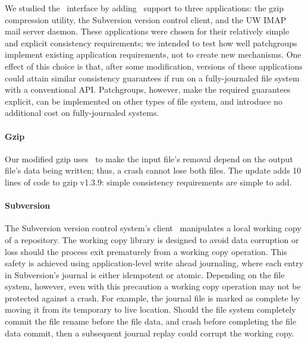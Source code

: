 
We studied the \patchgroup\ interface by adding \patchgroup\ support to three
applications: the gzip compression utility, the Subversion version control
client, and the UW IMAP mail server daemon.
%
These applications were chosen for their relatively simple and explicit
consistency requirements; we intended to test how well patchgroups
implement existing application requirements, not to create new mechanisms.
One effect of this choice is that, after some modification, versions of
these applications could attain similar consistency guarantees if run on a
fully-journaled file system with a conventional API.  Patchgroups, however,
make the required guarantees explicit, can be implemented on other types of
file system, and introduce no additional cost on fully-journaled systems.


\paragraph{Gzip}
\label{sec:patchgroup:gzip}

Our modified gzip uses \patchgroups\ to make the input file's
removal depend on the output file's data being written; thus,
a crash cannot lose both files. The update adds 10 lines of code to gzip
v1.3.9: simple consistency requirements are simple to add.

\paragraph{Subversion}
\label{sec:patchgroup:svn}


The Subversion version control system's client~\cite{svn} manipulates a
local working copy of a repository.
%
The working copy library is designed to avoid data corruption or loss
should the process exit prematurely from a working copy operation.
%
This safety is achieved using application-level write ahead journaling,
where each entry in Subversion's journal is either idempotent or
atomic.
%
Depending on the file system, however, even with this precaution a
working copy operation may not be protected against a crash.
%
For example, the journal file is marked as complete by moving it from
its temporary to live location.
%
Should the file system completely commit the file rename before
the file data, and crash before completing the file data commit, then
a subsequent journal replay could corrupt the working copy.

